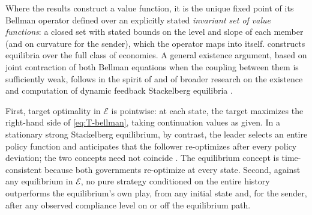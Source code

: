  Where the results
construct a value function, it is the unique fixed point of its Bellman operator defined
over an explicitly stated \emph{invariant set of value functions}: a closed set with
stated bounds on the level and slope of each member (and on
curvature for the sender), which the operator maps into itself.  constructs
equilibria over the full class of economies. A general existence argument, based on
joint contraction of both Bellman equations when the coupling between them is
sufficiently weak, follows in the spirit of \citet{StokeyLucas1989} and of broader
research on the existence and computation of dynamic feedback Stackelberg equilibria
\citep{HeLiuChen2025,LiSojoudiTomlinFridovichKeil2024}.

First, target optimality in $\mathcal E$ is pointwise: at each state, the target
maximizes the right-hand side of \eqref{eq:T-bellman}, taking continuation values as
given. In a stationary strong Stackelberg equilibrium, by contrast, the leader selects an
entire policy function and anticipates that the follower re-optimizes after every policy
deviation; the two concepts need not coincide \citep{Bucarey2023,KudoAkimoto2026}. The
equilibrium concept is time-consistent because both governments re-optimize at every
state. Second, against any equilibrium in $\mathcal E$, no pure strategy conditioned on
the entire history outperforms the equilibrium's own play, from any initial state
and, for the sender, after any observed compliance level on or off the equilibrium
path.

